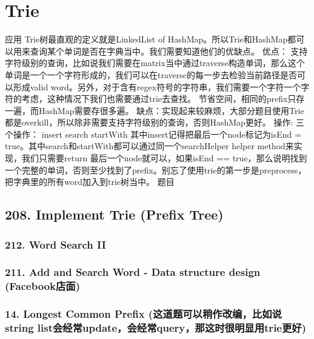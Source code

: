\documentclass[9pt, b5paaper]{book}
\begin{document}
\chapter{Trie}
\label{sec-2}
应用
Trie树最直观的定义就是LinkedList of HashMap。所以Trie和HashMap都可以用来查询某个单词是否在字典当中。我们需要知道他们的优缺点。
优点：
支持字符级别的查询，比如说我们需要在matrix当中通过traverse构造单词，那么这个单词是一个一个字符形成的，我们可以在traverse的每一步去检验当前路径是否可以形成valid word。另外，对于含有regex符号的字符串，我们需要一个字符一个字符的考虑，这种情况下我们也需要通过trie去查找。
节省空间，相同的prefix只存一遍，而HashMap需要存很多遍。
缺点：实现起来较麻烦，大部分题目使用Trie都是overkill，所以除非需要支持字符级别的查询，否则HashMap更好。
操作: 三个操作：
insert
search
startWith
其中insert记得把最后一个node标记为isEnd = true。其中search和startWith都可以通过同一个searchHelper helper method来实现，我们只需要return 最后一个node就可以，如果isEnd == true，那么说明找到一个完整的单词，否则至少找到了prefix。别忘了使用trie的第一步是preprocess，把字典里的所有word加入到trie树当中。
题目
\section{208. Implement Trie (Prefix Tree)}
\label{sec-2-1}
\subsection{212. Word Search II}
\label{sec-2-1-1}
\subsection{211. Add and Search Word - Data structure design (Facebook店面)}
\label{sec-2-1-2}
\subsection{14. Longest Common Prefix (这道题可以稍作改编，比如说string list会经常update，会经常query，那这时很明显用trie更好)}
\label{sec-2-1-3}
\end{document}
